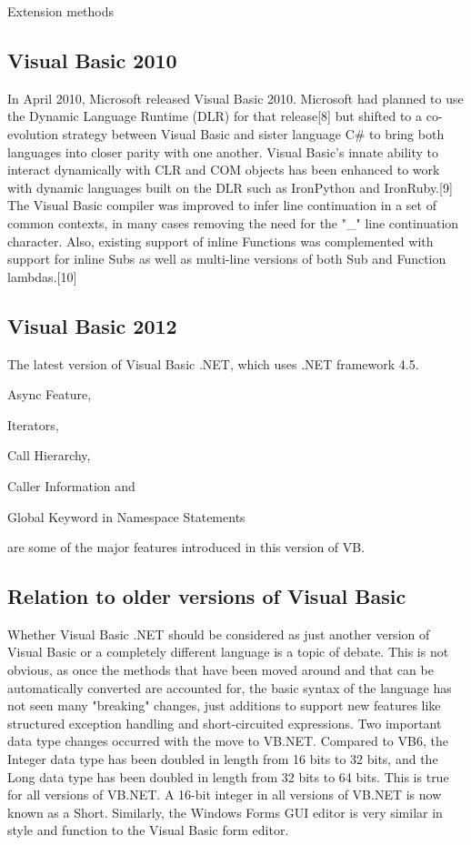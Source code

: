 Extension methods

\subsection{Visual Basic 2010}

In April 2010, Microsoft released Visual Basic 2010. Microsoft had planned to use the Dynamic Language Runtime (DLR) for that release[8] but shifted to a co-evolution strategy between Visual Basic and sister language C\# to bring both languages into closer parity with one another. Visual Basic's innate ability to interact dynamically with CLR and COM objects has been enhanced to work with dynamic languages built on the DLR such as IronPython and IronRuby.[9] The Visual Basic compiler was improved to infer line continuation in a set of common contexts, in many cases removing the need for the "\_" line continuation character. Also, existing support of inline Functions was complemented with support for inline Subs as well as multi-line versions of both Sub and Function lambdas.[10]


\subsection{Visual Basic 2012}

The latest version of Visual Basic .NET, which uses .NET framework 4.5. 

Async Feature, 

Iterators, 

Call Hierarchy, 

Caller Information and 

Global Keyword in Namespace Statements 

are some of the major features introduced in this version of VB.

\subsection{Relation to older versions of Visual Basic}

Whether Visual Basic .NET should be considered as just another version of Visual Basic or a completely different language is a topic of debate. This is not obvious, as once the methods that have been moved around and that can be automatically converted are accounted for, the basic syntax of the language has not seen many "breaking" changes, just additions to support new features like structured exception handling and short-circuited expressions. Two important data type changes occurred with the move to VB.NET. Compared to VB6, the Integer data type has been doubled in length from 16 bits to 32 bits, and the Long data type has been doubled in length from 32 bits to 64 bits. This is true for all versions of VB.NET. A 16-bit integer in all versions of VB.NET is now known as a Short. Similarly, the Windows Forms GUI editor is very similar in style and function to the Visual Basic form editor.

